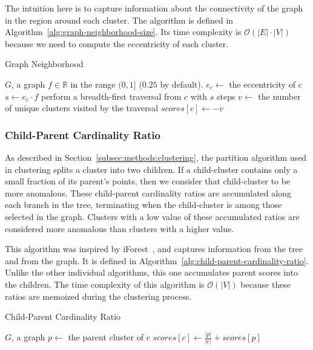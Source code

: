 The intuition here is to capture information about the connectivity of the graph in the region around each cluster.
The algorithm is defined in Algorithm~\ref{alg:graph-neighborhood-size}.
Its time complexity is $\mathcal{O}(|E| \cdot |V|)$ because we need to compute the eccentricity of each cluster.

\begin{algorithm}[h]
    \caption{Graph Neighborhood}
    \label{alg:graph-neighborhood-size}
\begin{algorithmic}[1]
    \REQUIRE $G$, a graph
    \REQUIRE $f \in \mathbb{R}$ in the range $(0,1]$ ($0.25$ by default).
        \STATE $e_c \gets$ the eccentricity of $c$
        \STATE $s \gets e_c \cdot f$
        \STATE perform a breadth-first traversal from $c$ with $s$ steps
        \STATE $v \gets$ the number of unique clusters visited by the traversal
        \STATE $scores[c] \gets -v$
    \ENDFOR
\end{algorithmic}
\end{algorithm}


\subsubsection{Child-Parent Cardinality Ratio}
\label{subsubsec:methods:individual-algorithms:child-parent-cardinality-ratio}
As described in Section~\ref{subsec:methods:clustering}, the partition algorithm used in clustering splits a cluster into two children.
If a child-cluster contains only a small fraction of its parent's points, then we consider that child-cluster to be more anomalous.
These child-parent cardinality ratios are accumulated along each branch in the tree, terminating when the child-cluster is among those selected in the graph.
Clusters with a low value of these accumulated ratios are considered more anomalous than clusters with a higher value.

This algorithm was inspired by iForest~\cite{tony2008iforest}, and captures information from the tree and from the graph.
It is defined in Algorithm~\ref{alg:child-parent-cardinality-ratio}.
Unlike the other individual algorithms, this one accumulates parent scores into the children.
The time complexity of this algorithm is $\mathcal{O}(|V|)$ because these ratios are memoized during the clustering process.

\begin{algorithm}[h]
    \caption{Child-Parent Cardinality Ratio}
    \label{alg:child-parent-cardinality-ratio}
\begin{algorithmic}[1]
    \REQUIRE $G$, a graph
        \STATE $p \gets$ the parent cluster of $c$
        \STATE $scores[c] \gets \frac{|p|}{|c|} + scores[p]$
    \ENDFOR
\end{algorithmic}
\end{algorithm}


